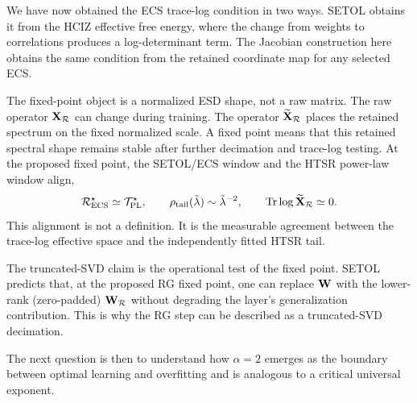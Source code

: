 We have now obtained the ECS trace-log condition in two ways.
SETOL obtains it from the HCIZ effective free energy, where the change from weights to correlations produces a log-determinant term.
The Jacobian construction  here obtains the same condition from the retained coordinate map for any selected ECS.


The fixed-point object is a normalized ESD shape, not a raw matrix.  The raw operator $\mathbf X_{\mathcal R}$ can change during training.  The operator $\widetilde{\mathbf X}_{\mathcal R}$ places the retained spectrum on the fixed normalized scale.  A fixed point means that this retained spectral shape remains stable after further decimation and trace-log testing.  At the proposed fixed point, the SETOL/ECS window and the HTSR power-law window align,
\begin{equation}
    \mathcal R_{\rm ECS}^{\star}
    \simeq
    \mathcal T_{\rm PL}^{\star},
    \qquad
    \rho_{\rm tail}(\tilde{\lambda})\sim\tilde{\lambda}^{-2},
    \qquad
    \operatorname{Tr}\log\widetilde{\mathbf X}_{\mathcal R}\simeq0 .
    \label{eq:alignment_claim_operational_v5}
\end{equation}
This alignment is not a definition.  It is the measurable agreement between the trace-log effective space and the independently fitted HTSR tail.

The truncated-SVD claim is the operational test of the fixed point.  SETOL predicts that, at the proposed RG fixed point,
one can replace $\mathbf W$ with the lower-rank (zero-padded) $\mathbf W_{\mathcal R}$ without degrading the layer's generalization contribution.
This is why the RG step can be described as a truncated-SVD decimation.

The next question is then to understand how $\alpha=2$ emerges as the boundary between
optimal learning and overfitting and is analogous to a critical universal exponent.
